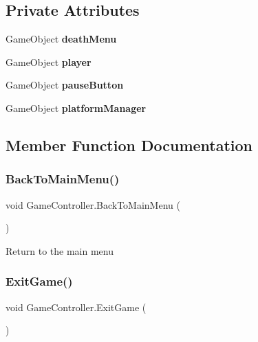 \subsection*{Private Attributes}
\begin{DoxyCompactItemize}
\item 
\mbox{\label{class_game_controller_a0359e3ee0e870c4f6c6d0466a17db4fe}} 
Game\+Object {\bfseries death\+Menu}
\item 
\mbox{\label{class_game_controller_a743e4bdfdea7c2544174b29264f63890}} 
Game\+Object {\bfseries player}
\item 
\mbox{\label{class_game_controller_afa3dbc1dd9168d34d83c533dc342c485}} 
Game\+Object {\bfseries pause\+Button}
\item 
\mbox{\label{class_game_controller_a1a900c0ee662da5751a27bb288583623}} 
Game\+Object {\bfseries platform\+Manager}
\end{DoxyCompactItemize}


\subsection{Member Function Documentation}
\mbox{\label{class_game_controller_a58d386f77a7fc928a560963e2beec59e}} 
\subsubsection{\texorpdfstring{Back\+To\+Main\+Menu()}{BackToMainMenu()}}
{\footnotesize\ttfamily void Game\+Controller.\+Back\+To\+Main\+Menu (\begin{DoxyParamCaption}{ }\end{DoxyParamCaption})}

Return to the main menu \mbox{\label{class_game_controller_ac89db365db6f9a2dde8d6bb346d39d3b}} 
\subsubsection{\texorpdfstring{Exit\+Game()}{ExitGame()}}
{\footnotesize\ttfamily void Game\+Controller.\+Exit\+Game (\begin{DoxyParamCaption}{ }\end{DoxyParamCaption})}

